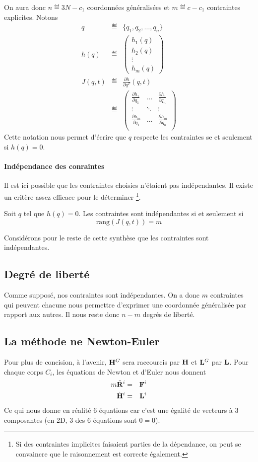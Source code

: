 On aura donc $n \eqdef 3N - c_1$ coordonnées généralisées et $m \eqdef c - c_1$ contraintes explicites.
Notons
\begin{eqnarray*}
	q & \eqdef & \{q_1, q_2, \ldots, q_n\}\\
	h(q) & \eqdef & \begin{pmatrix}h_1(q)\\h_2(q)\\\vdots\\h_m(q)\end{pmatrix}\\
	J(q, t) & \eqdef & \frac{\partial h}{\partial q^T}(q, t)\\
	& \eqdef &
	\begin{pmatrix}
		\frac{\partial h_1}{\partial q_1} & \ldots & \frac{\partial h_1}{\partial q_n}\\
		\vdots & \ddots & \vdots\\
		\frac{\partial h_m}{\partial q_1} & \ldots & \frac{\partial h_m}{\partial q_n}\\
	\end{pmatrix}
\end{eqnarray*}
Cette notation nous permet d'écrire que $q$ respecte les contraintes se et seulement si $h(q) = 0$.

\paragraph{Indépendance des conraintes}
Il est ici possible que les contraintes choisies n'étaient pas indépendantes.
Il existe un critère assez efficace pour le déterminer
\footnote{Si des contraintes implicites faisaient parties de la dépendance, on peut se convaincre que le raisonnement est correcte également.}.

Soit $q$ tel que $h(q) = 0$.
Les contraintes sont indépendantes si et seulement si
\[ \mathrm{rang} (J(q, t)) = m \]

Considérons pour le reste de cette synthèse que les contraintes sont indépendantes.

\subsection{Degré de liberté}
Comme supposé, nos contraintes sont indépendantes.
On a donc $m$ contraintes qui peuvent chacune nous permettre d'exprimer une coordonnée généralisée par rapport aux autres.
Il nous reste donc $n - m$ degrés de liberté.

\subsection{La méthode ne Newton-Euler}
Pour plus de concision, à l'avenir, ${\bf H}^G$ sera raccourcis par ${\bf H}$ et ${\bf L}^G$ par ${\bf L}$.
Pour chaque corps $C_i$, les équations de Newton et d'Euler nous donnent
\begin{eqnarray*}
	m\ddot{\bf R}^i &=& {\bf F}^i\\
	\dot{{\bf H}}^i &=& {\bf L}^i
\end{eqnarray*}
Ce qui nous donne en réalité 6 équations car c'est une égalité de vecteurs à 3 composantes (en 2D, 3 des 6 équations sont $0 = 0$).

